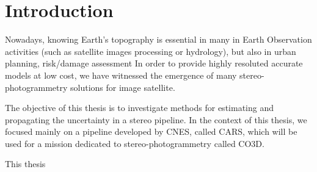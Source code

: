 \chapter*{Introduction}
Nowadays, knowing Earth's topography is essential in many in Earth Observation activities (such as satellite images processing or hydrology), but also in urban planning, risk/damage assessment \etc In order to provide highly resoluted accurate models at low cost, we have witnessed the emergence of many stereo-photogrammetry solutions for image satellite.

The objective of this thesis is to investigate methods for estimating and propagating the uncertainty in a stereo pipeline. In the context of this thesis, we focused mainly on a pipeline developed by CNES, called CARS, which will be used for a mission dedicated to stereo-photogrammetry called CO3D. 

This thesis 
\pagebreak